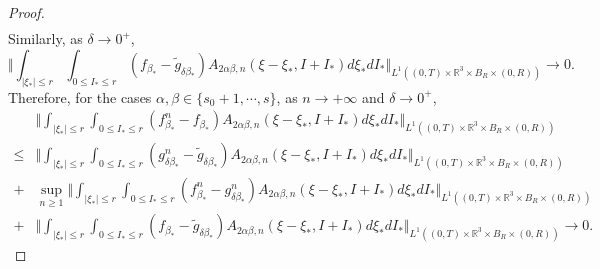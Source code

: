 \documentclass[reqno,11pt]{amsart}
\numberwithin{equation}{section}
\def\no{\nonumber}
\def\R{\mathbb{R}}
\begin{document}
\begin{proof}
\begin{equation*}
\begin{aligned}
  \end{aligned}
\end{equation*}
Similarly, as $\delta \to 0^+$,
\begin{equation*}
	\Vert \int_{|\xi_* |\leq r} \int_{0\leq I_* \leq r} (f_{ \beta_*} -\tilde{g}_{\delta \beta_*}) A_{2\alpha \beta ,n}(\xi -\xi_* ,I+I_* ) d\xi_* dI_* \Vert_{L^1((0,T)\times \R^3 \times B_R \times (0,R))} \rightarrow  0.
\end{equation*}
Therefore, for the cases $ \alpha, \beta \in \{ s_0 + 1, \cdots, s \} $, as $n \rightarrow + \infty $ and $ \delta \rightarrow 0^+$,
	\begin{align}\label{K1}
		\no &\Vert \int_{|\xi_* |\leq r} \int_{0\leq I_* \leq r} (f^n_{ \beta_*}-f_{\beta_*}) A_{2\alpha \beta ,n}(\xi -\xi_* ,I+I_* ) d\xi_* dI_*  \Vert_{L^1((0,T)\times \R^3 \times B_R \times (0,R))} \\
		\no \leq & \Vert \int_{|\xi_* |\leq r} \int_{0\leq I_* \leq r} (g^n_{\delta \beta_*}-\tilde{g}_{\delta \beta_*}) A_{2\alpha \beta ,n} (\xi -\xi_* ,I+I_* )d\xi_* dI_* \Vert_{L^1((0,T)\times \R^3 \times B_R \times (0,R))} \\
		\no + & \sup_{n \geq 1} \Vert \int_{|\xi_* |\leq r} \int_{0\leq I_* \leq r} (f^n_{ \beta_*} -g^n_{\delta \beta_*}) A_{2\alpha \beta ,n} (\xi -\xi_* ,I+I_* )d\xi_* dI_* \Vert_{L^1((0,T)\times \R^3 \times B_R \times (0,R))} \\
		+ &\Vert \int_{|\xi_* |\leq r} \int_{0\leq I_* \leq r} (f_{\beta_*} -\tilde{g}_{\delta \beta_*}) A_{2\alpha \beta,n }(\xi -\xi_* ,I+I_* ) d\xi_* dI_* \Vert_{L^1((0,T)\times \R^3 \times B_R \times (0,R))} \rightarrow 0.
	\end{align}


\end{proof}
\end{document}
